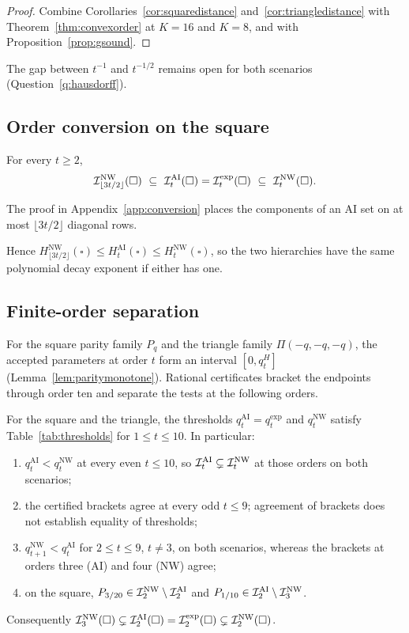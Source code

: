 \begin{proof}
Combine Corollaries~\ref{cor:squaredistance} and~\ref{cor:triangledistance} with Theorem~\ref{thm:convexorder} at $K=16$ and $K=8$, and with Proposition~\ref{prop:gsound}.
\end{proof}

The gap between $t^{-1}$ and $t^{-1/2}$ remains open for both scenarios (Question~\ref{q:hausdorff}).

\subsection{Order conversion on the square}\label{sec:conversion}

\begin{theorem}\label{thm:orderconversion}
For every $t\ge2$,
\[
\INW_{\lfloor3t/2\rfloor}(\square)\ \subseteq\ \IAI_t(\square)=\Iexp_t(\square)\ \subseteq\ \INW_t(\square).
\]
\end{theorem}

The proof in Appendix~\ref{app:conversion} places the components of an AI set on at most $\lfloor3t/2\rfloor$ diagonal rows.

Hence $H^{\mathrm{NW}}_{\lfloor3t/2\rfloor}(\square)\le H^{\mathrm{AI}}_t(\square)\le H^{\mathrm{NW}}_t(\square)$, so the two hierarchies have the same polynomial decay exponent if either has one.

\subsection{Finite-order separation}\label{sec:lowthresholds}

For the square parity family $P_q$ and the triangle family $\Pi(-q,-q,-q)$, the accepted parameters at order $t$ form an interval $[0,q_t^H]$ (Lemma~\ref{lem:paritymonotone}). Rational certificates bracket the endpoints through order ten and separate the tests at the following orders.

\begin{proposition}\label{prop:paritythresholds}
For the square and the triangle, the thresholds $q^{\mathrm{AI}}_t=q^{\mathrm{exp}}_t$ and $q^{\mathrm{NW}}_t$ satisfy Table~\ref{tab:thresholds} for $1\le t\le10$. In particular:
\begin{enumerate}[label=(\roman*),nosep]
\item $q^{\mathrm{AI}}_t<q^{\mathrm{NW}}_t$ at every even $t\le10$, so $\mathcal I^{\mathrm{AI}}_t\subsetneq\mathcal I^{\mathrm{NW}}_t$ at those orders on both scenarios;
\item the certified brackets agree at every odd $t\le9$; agreement of brackets does not establish equality of thresholds;
\item $q^{\mathrm{NW}}_{t+1}<q^{\mathrm{AI}}_t$ for $2\le t\le9$, $t\ne3$, on both scenarios, whereas the brackets at orders three (AI) and four (NW) agree;
\item on the square, $P_{3/20}\in\mathcal I^{\mathrm{NW}}_2\setminus\mathcal I^{\mathrm{AI}}_2$ and $P_{1/10}\in\mathcal I^{\mathrm{AI}}_2\setminus\mathcal I^{\mathrm{NW}}_3$.
\end{enumerate}
Consequently $\mathcal I^{\mathrm{NW}}_3(\square)\subsetneq\mathcal I^{\mathrm{AI}}_2(\square)=\mathcal I^{\mathrm{exp}}_2(\square)\subsetneq\mathcal I^{\mathrm{NW}}_2(\square)$.
\end{proposition}

